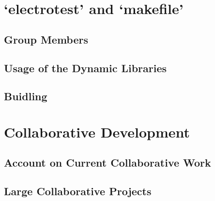 \documentclass[a4paper,11pt,twoside]{article}
\begin{document}
\section{`electrotest' and `makefile'}
\subsection{Group Members}
\subsection{Usage of the Dynamic Libraries}
\subsection{Buidling}

\section{Collaborative Development}
\subsection{Account on Current Collaborative Work}
\subsection{Large Collaborative Projects}

%
\end{document}
